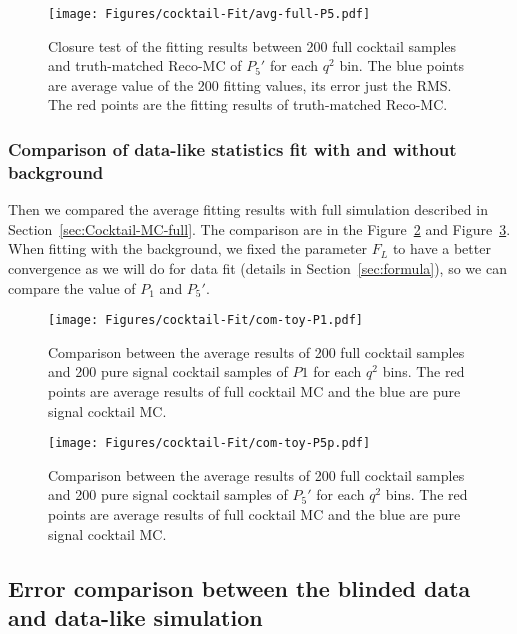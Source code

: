 \begin{figure}[!hbt]
  \centering
  \texttt{[image: Figures/cocktail-Fit/avg-full-P5.pdf]}
  \caption{Closure test of the fitting results between 200 full cocktail
 samples and truth-matched Reco-MC of $P_5'$ for each $q^2$ bin. The blue points
are average value of the 200 fitting values, its error just the RMS. The red
points are the fitting results of truth-matched Reco-MC. }
  \label{fig:closure-full-cocktail-P5'}
\end{figure}

\clearpage

\subsubsection{Comparison of data-like statistics fit with and without background}
\label{sec:Cocktail-MC-com}

Then we compared the average fitting results with full simulation described in
Section~\ref{sec:Cocktail-MC-full}. The comparison are in the Figure~\ref{fig:comparison-cocktail-P1}
and Figure~\ref{fig:comparison-cocktail-P5}.
When fitting with the background, we fixed the parameter $F_L$ to have a better convergence
as we will do for data fit (details in Section~\ref{sec:formula}), so we can
compare the value of $P_1$ and $P_5'$.

\begin{figure}[!hbt]
  \centering
  \texttt{[image: Figures/cocktail-Fit/com-toy-P1.pdf]}
  \caption{Comparison between the average results of 200 full cocktail
          samples and 200 pure signal cocktail samples of $P1$ for each $q^2$
    bins. The red points are average results of full cocktail MC and the blue are
     pure signal cocktail MC.}
  \label{fig:comparison-cocktail-P1}
\end{figure}


\begin{figure}[!hbt]
  \centering
  \texttt{[image: Figures/cocktail-Fit/com-toy-P5p.pdf]}
  \caption{Comparison between the average results of 200 full cocktail
          samples and 200 pure signal cocktail samples of $P_5'$ for each $q^2$
    bins. The red points are average results of full cocktail MC and the blue are
     pure signal cocktail MC.}
  \label{fig:comparison-cocktail-P5}
\end{figure}


\clearpage

\clearpage

\subsection{Error comparison between the blinded data and data-like simulation}
\label{sec:error-comparison}

